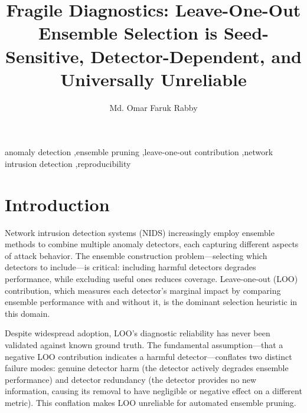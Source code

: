 \documentclass[preprint,12pt]{elsarticle}
\begin{document}
\begin{frontmatter}

\title{Fragile Diagnostics: Leave-One-Out Ensemble Selection is Seed-Sensitive, Detector-Dependent, and Universally Unreliable}

\author[aff1]{Md. Omar Faruk Rabby}

\begin{abstract}
\end{abstract}

\begin{keyword}
anomaly detection \sep ensemble pruning \sep leave-one-out contribution \sep network intrusion detection \sep reproducibility
\end{keyword}

\end{frontmatter}

\section{Introduction}

Network intrusion detection systems (NIDS) increasingly employ ensemble methods to combine multiple anomaly detectors, each capturing different aspects of attack behavior. The ensemble construction problem---selecting which detectors to include---is critical: including harmful detectors degrades performance, while excluding useful ones reduces coverage. Leave-one-out (LOO) contribution, which measures each detector's marginal impact by comparing ensemble performance with and without it, is the dominant selection heuristic in this domain.

Despite widespread adoption, LOO's diagnostic reliability has never been validated against known ground truth. The fundamental assumption---that a negative LOO contribution indicates a harmful detector---conflates two distinct failure modes: genuine detector harm (the detector actively degrades ensemble performance) and detector redundancy (the detector provides no new information, causing its removal to have negligible or negative effect on a different metric). This conflation makes LOO unreliable for automated ensemble pruning.
\end{document}
